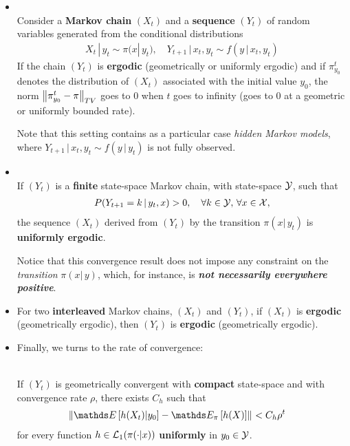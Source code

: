 \documentclass[11pt]{article}
\begin{document}
\begin{itemize}
\item \begin{theorem}\citep{robert1999monte}\\
Consider a \textbf{Markov chain} $(X_t)$ and a \textbf{sequence} $(Y_t)$ of random variables generated from the conditional distributions 
\begin{align*}
X_t \,|\, y_t \sim \pi(x|\,y_t), \quad Y_{t+1}\,|\,x_t, y_t \sim f(y \,|\, x_t, y_t)
\end{align*}
If the chain $(Y_t)$ is \textbf{ergodic} (geometrically or uniformly ergodic) and if $\pi_{y_0}^{t}$ denotes the distribution of $(X_t)$ associated with the initial value $y_0$, the norm $\left\|\pi_{y_0}^{t} - \pi\right\|_{TV}$ goes to $0$ when $t$ goes to infinity (goes to $0$ at a geometric or uniformly bounded rate).
\end{theorem} 
Note that this setting contains as a particular case \emph{hidden Markov models}, where $Y_{t+1}\,|\,x_t, y_t \sim f(y \,|\, y_t)$ is not fully observed.

\item 
\begin{theorem}\citep{robert1999monte}\\
If $(Y_t)$  is a \textbf{finite} state-space Markov chain, with state-space ${\mathcal Y}$, such that
\begin{align*}
P(Y_{t+1} =k\,|\,y_t, x ) > 0, \quad \forall k \in {\mathcal Y},\, \forall x\in {\mathcal X},
\end{align*}
the sequence $(X_t)$ derived from $(Y_t)$ by the transition $\pi(x|\,y_t)$ is \textbf{uniformly ergodic}.
\end{theorem} Notice that this convergence result does not impose any constraint on the \emph{transition} $\pi(x|\,y)$, which, for instance, is \emph{\textbf{not necessarily everywhere positive}}.

\item \begin{corollary}
For two \textbf{interleaved} Markov chains, $(X_t)$ and $(Y_t)$, if $(X_t)$ is \textbf{ergodic} (geometrically ergodic), then $(Y_t)$ is \textbf{ergodic} (geometrically ergodic).
\end{corollary}

\item Finally, we turns to the rate of convergence:
\begin{proposition}\citep{robert1999monte}\\
If $(Y_t)$ is geometrically convergent with \textbf{compact} state-space and with convergence rate $\rho$, there exists $C_h$ such that
\begin{align*}
\norm{\E{}{h(X_t)|y_0} - \E{\pi}{h(X)}}{} &< C_h \rho^t
\end{align*} for every function $h \in {\mathcal L}_{1}(\pi(\cdot|x))$ \textbf{uniformly} in $y_{0} \in {\mathcal Y}$.
\end{proposition}
\end{itemize}
\end{document}
